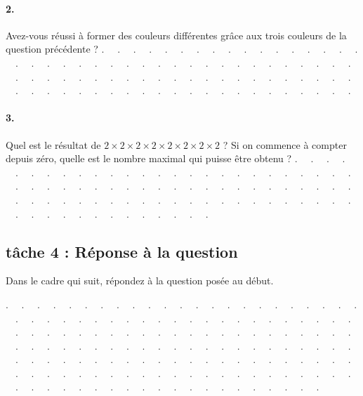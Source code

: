 \documentclass[12pt,a4paper,notitlepage]{article}
\begin{document}
\paragraph{2.} Avez-vous réussi à former des couleurs différentes grâce aux trois couleurs de la question précédente ?
\noindent . \ \ . \ \ . \ \ . \ \ . \ \ . \ \ . \ \ . \ \ . \ \ . \ \ . \ \ . \ \ .
\ \ . \ \ . \ \ . \ \ . \ \ . \ \ . \ \ . \ \ . \ \ . \ \ . \ \ . \ \ . \ \ . \ \ . 
\ \ . \ \ . \ \ . \ \ . \ \ . \ \ . \ \ . \ \ . \ \ . \ \ . \ \ . \ \ . \ \ . \ \ . 
\ \ . \ \ . \ \ . \ \ . \ \ . \ \ . \ \ . \ \ . \ \ . \ \ . \ \ . \ \ . \ \ . \ \ . 
\ \ . \ \ . \ \ . \ \ . \ \ . \ \ . \ \ . \ \ . \ \ . \ \ . \ \ . \ \ . \ \ . \ \ . 
\ \ . \ \ . \ \ . \ \ . \ \ . \ \ . \ \ . \ \ . \ \ . \ \ . \ \ . \ \ . \ \ . \ \ . 

\paragraph{3.} Quel est le résultat de $2 \times 2 \times 2 \times 2 \times 2 \times 2 \times 2 \times 2$ ? Si on commence à compter depuis zéro, quelle est le nombre maximal qui puisse être obtenu ?
\noindent . \ \ . \ \ . \ \ . \ \ . \ \ . \ \ . \ \ . \ \ . \ \ . \ \ . \ \ . \ \ .
\ \ . \ \ . \ \ . \ \ . \ \ . \ \ . \ \ . \ \ . \ \ . \ \ . \ \ . \ \ . \ \ . \ \ . 
\ \ . \ \ . \ \ . \ \ . \ \ . \ \ . \ \ . \ \ . \ \ . \ \ . \ \ . \ \ . \ \ . \ \ . 
\ \ . \ \ . \ \ . \ \ . \ \ . \ \ . \ \ . \ \ . \ \ . \ \ . \ \ . \ \ . \ \ . \ \ . 
\ \ . \ \ . \ \ . \ \ . \ \ . \ \ . \ \ . \ \ . \ \ . \ \ . \ \ . \ \ . \ \ . \ \ . 
\ \ . \ \ . \ \ . \ \ . \ \ . \ \ . \ \ . \ \ . \ \ . \ \ . \ \ . \ \ . \ \ . \ \ . 

\subsection*{tâche 4 : Réponse à la question}
Dans le cadre qui suit, répondez à la question posée au début.
\begin{bclogo}[couleur=yellow!5, arrondi=0.1, logo=\bccrayon, nobreak=true]{}

\noindent . \ \ . \ \ . \ \ . \ \ . \ \ . \ \ . \ \ . \ \ . \ \ . \ \ . \ \ . \ \ .
\ \ . \ \ . \ \ . \ \ . \ \ . \ \ . \ \ . \ \ . \ \ . \ \ . \ \ . \ \ . \ \ . \ \ . 
\ \ . \ \ . \ \ . \ \ . \ \ . \ \ . \ \ . \ \ . \ \ . \ \ . \ \ . \ \ . \ \ . \ \ . 
\ \ . \ \ . \ \ . \ \ . \ \ . \ \ . \ \ . \ \ . \ \ . \ \ . \ \ . \ \ . \ \ . \ \ . 
\ \ . \ \ . \ \ . \ \ . \ \ . \ \ . \ \ . \ \ . \ \ . \ \ . \ \ . \ \ . \ \ . \ \ . 
\ \ . \ \ . \ \ . \ \ . \ \ . \ \ . \ \ . \ \ . \ \ . \ \ . \ \ . \ \ . \ \ . \ \ . 
\ \ . \ \ . \ \ . \ \ . \ \ . \ \ . \ \ . \ \ . \ \ . \ \ . \ \ . \ \ . \ \ . \ \ . 
\ \ . \ \ . \ \ . \ \ . \ \ . \ \ . \ \ . \ \ . \ \ . \ \ . \ \ . \ \ . \ \ . \ \ . 
\ \ . \ \ . \ \ . \ \ . \ \ . \ \ . \ \ . \ \ . \ \ . \ \ . \ \ . \ \ . \ \ . \ \ . 
\ \ . \ \ . \ \ . \ \ . \ \ . \ \ . \ \ . \ \ . \ \ . \ \ . \ \ . \ \ . \ \ . \ \ . 
\ \ . \ \ . \ \ . \ \ . \ \ . \ \ . \ \ . \ \ . \ \ . \ \ . \ \ . \ \ . \ \ . \ \ . 

\end{bclogo}
\end{document}
